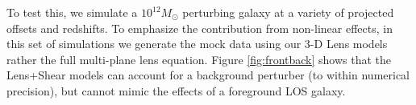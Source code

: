 To test this, we simulate a $10^{12} M_\odot$ perturbing galaxy at a variety of projected offsets and redshifts. To emphasize the contribution from non-linear effects, in this set of simulations we generate the mock data using our 3-D Lens models rather the full multi-plane lens equation. Figure \ref{fig:frontback} shows that the Lens+Shear models can account for a background perturber (to within numerical precision), but cannot mimic the effects of a foreground LOS galaxy.
